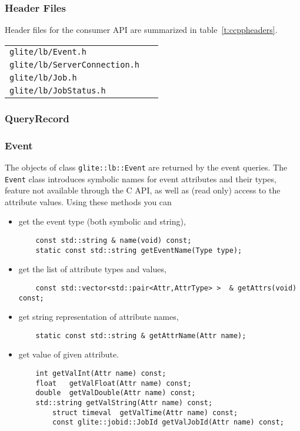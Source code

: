 \subsubsection{Header Files}
Header files for the \LB consumer API are summarized in table~\ref{t:ccppheaders}.
\begin{table}[h]
\begin{tabularx}{\textwidth}{>{\tt}lX}
glite/lb/Event.h & \\
glite/lb/ServerConnection.h & \\
glite/lb/Job.h & \\
glite/lb/JobStatus.h & \\

\end{tabularx}
\end{table}

\subsubsection{QueryRecord}
\subsubsection{Event}
The objects of class \verb'glite::lb::Event' are returned by the \LB event
queries. The \verb'Event' class introduces symbolic names for event attributes
and their types, feature not available through the C API, as well as
(read only) access to the attribute values.  Using these methods you can 
\begin{itemize}
\item get the event type (both symbolic and string),
\begin{lstlisting}
	const std::string & name(void) const;
	static const std::string getEventName(Type type);
\end{lstlisting}
\item get the list of attribute types and values,
\begin{lstlisting}
	const std::vector<std::pair<Attr,AttrType> >  &	getAttrs(void) const;
\end{lstlisting}
\item get string representation of attribute names,
\begin{lstlisting}
	static const std::string & getAttrName(Attr name);
\end{lstlisting}
\item get value of given attribute.
\begin{lstlisting}
	int	getValInt(Attr name) const;
	float	getValFloat(Attr name) const;
	double	getValDouble(Attr name) const;
	std::string getValString(Attr name) const;
        struct timeval	getValTime(Attr name) const;
        const glite::jobid::JobId getValJobId(Attr name) const;
\end{lstlisting}
\end{itemize}

